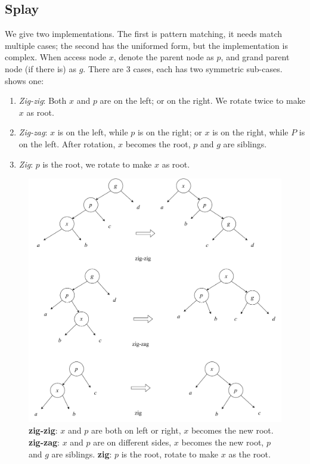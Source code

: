 \documentclass[b5paper]{article}
\begin{document}
\subsection{Splay}

We give two implementations. The first is pattern matching, it needs match multiple cases; the second has the uniformed form, but the implementation is complex. When access node $x$, denote the parent node as $p$, and grand parent node (if there is) as $g$. There are 3 cases, each has two symmetric sub-cases.  shows one:

\begin{enumerate}
\item {\em Zig-zig}: Both $x$ and $p$ are on the left; or on the right. We rotate twice to make $x$ as root.

\item {\em Zig-zag}: $x$ is on the left, while $p$ is on the right; or $x$ is on the right, while $P$ is on the left. After rotation, $x$ becomes the root, $p$ and $g$ are siblings.

\item {\em Zig}: $p$ is the root, we rotate to make $x$ as root.
\end{enumerate}

\begin{figure}[htbp]
  \centering
  \includegraphics[scale=0.45]{img/splay}
  \caption{\textbf{zig-zig}: $x$ and $p$ are both on left or right, $x$ becomes the new root. \textbf{zig-zag}: $x$ and $p$ are on different sides, $x$ becomes the new root, $p$ and $g$ are siblings. \textbf{zig}: $p$ is the root, rotate to make $x$ as the root.}
  \label{fig:splay}
\end{figure}
\end{document}
